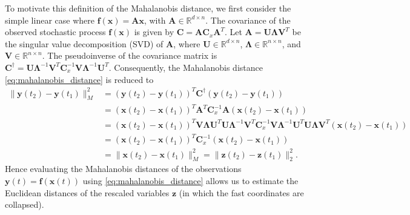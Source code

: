 To motivate this definition of the Mahalanobis distance, we first consider the simple linear case where $\mathbf{f} (\mathbf{x}) = \mathbf{A} \mathbf{x}$, with $\mathbf{A} \in \mathbb{R}^{d \times n}$.
%
The covariance of the observed stochastic process $\mathbf{f} (\mathbf{x})$ is given by $\mathbf{C}=\mathbf{AC}_x\mathbf{A}^T$.
%
Let $\mathbf{A}= \mathbf{U} \mathbf{\Lambda} \mathbf{V}^T$ be the singular value decomposition (SVD) of $\mathbf{A}$, where $\mathbf{U} \in \mathbb{R}^{d \times n}$, $\mathbf{\Lambda} \in \mathbb{R}^{n \times n}$, and $\mathbf{V} \in \mathbb{R}^{n \times n}$.
%
The pseudoinverse of the covariance matrix is $\mathbf{C}^{\dagger} = \mathbf{U} \mathbf{\Lambda}^{-1} \mathbf{V}^T \mathbf{C}_x^{-1} \mathbf{V \Lambda} ^{-1} \mathbf{U}^T$. Consequently, the Mahalanobis distance \eqref{eq:mahalanobis_distance} is reduced to
\begin{equation}
\begin{aligned}
\| \mathbf{y}(t_2) - \mathbf{y}(t_1) \|^2_M &= (\mathbf{y}(t_2) - \mathbf{y}(t_1))^T  \mathbf{C}^{\dagger} (\mathbf{y}(t_2) - \mathbf{y}(t_1)) \\
 &= (\mathbf{x}(t_2) - \mathbf{x}(t_1))^T \mathbf{A}^T \mathbf{C}_x^{-1} \mathbf{A} (\mathbf{x}(t_2) - \mathbf{x}(t_1)) \\
 &= (\mathbf{x}(t_2) - \mathbf{x}(t_1))^T \mathbf{V \Lambda U}^T \mathbf{ U \Lambda}^{-1} \mathbf{V}^T \mathbf{C}_x^{-1} \mathbf{V \Lambda} ^{-1} \mathbf{U}^T \mathbf{U \Lambda V}^T (\mathbf{x}(t_2) - \mathbf{x}(t_1)) \\
 &= (\mathbf{x}(t_2) - \mathbf{x}(t_1))^T \mathbf{C}_x^{-1}  (\mathbf{x}(t_2) - \mathbf{x}(t_1)) \\
 &= \| \mathbf{x}(t_2) - \mathbf{x}(t_1) \|^2_M =  \| \mathbf{z}(t_2) - \mathbf{z}(t_1) \|^2_2 .
\end{aligned}
\end{equation}
Hence evaluating the Mahalanobis distances of the observations $\mathbf{y}(t) = \mathbf{f}(\mathbf{x}(t))$ using \eqref{eq:mahalanobis_distance} allows us to estimate the Euclidean distances of the rescaled variables $\mathbf{z}$ (in which the fast coordinates are collapsed).

